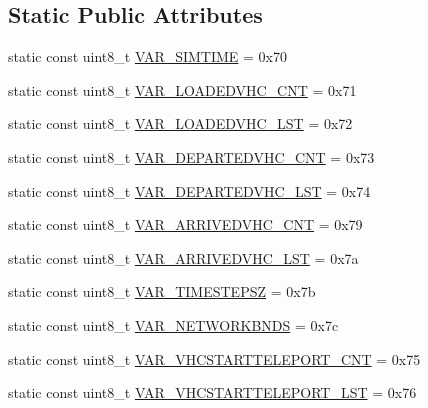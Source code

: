 \subsection*{Static Public Attributes}
\begin{DoxyCompactItemize}
\item 
static const uint8\+\_\+t \hyperlink{classtraci__api_1_1_simulation_ad85a2daa3b6e62afebf23c63aa54c5a7}{V\+A\+R\+\_\+\+S\+I\+M\+T\+I\+ME} = 0x70
\item 
static const uint8\+\_\+t \hyperlink{classtraci__api_1_1_simulation_a0c320b73a88c6bd0d5d15b9b7d8ca079}{V\+A\+R\+\_\+\+L\+O\+A\+D\+E\+D\+V\+H\+C\+\_\+\+C\+NT} = 0x71
\item 
static const uint8\+\_\+t \hyperlink{classtraci__api_1_1_simulation_aef180578795a463be2e4b4d47674f07e}{V\+A\+R\+\_\+\+L\+O\+A\+D\+E\+D\+V\+H\+C\+\_\+\+L\+ST} = 0x72
\item 
static const uint8\+\_\+t \hyperlink{classtraci__api_1_1_simulation_a2211a9befd772188a83012e61d0bf890}{V\+A\+R\+\_\+\+D\+E\+P\+A\+R\+T\+E\+D\+V\+H\+C\+\_\+\+C\+NT} = 0x73
\item 
static const uint8\+\_\+t \hyperlink{classtraci__api_1_1_simulation_a4e5cf74cd62df38b5e0a4e750983c6e1}{V\+A\+R\+\_\+\+D\+E\+P\+A\+R\+T\+E\+D\+V\+H\+C\+\_\+\+L\+ST} = 0x74
\item 
static const uint8\+\_\+t \hyperlink{classtraci__api_1_1_simulation_aa2763aba4aa46ba82dc9b1f258101ca4}{V\+A\+R\+\_\+\+A\+R\+R\+I\+V\+E\+D\+V\+H\+C\+\_\+\+C\+NT} = 0x79
\item 
static const uint8\+\_\+t \hyperlink{classtraci__api_1_1_simulation_ae7a55aa19afe46dd3e54ed60ccc736bf}{V\+A\+R\+\_\+\+A\+R\+R\+I\+V\+E\+D\+V\+H\+C\+\_\+\+L\+ST} = 0x7a
\item 
static const uint8\+\_\+t \hyperlink{classtraci__api_1_1_simulation_a32191847f48857d89c02e27c7134e862}{V\+A\+R\+\_\+\+T\+I\+M\+E\+S\+T\+E\+P\+SZ} = 0x7b
\item 
static const uint8\+\_\+t \hyperlink{classtraci__api_1_1_simulation_aae0a592bee89106e697c1eb2bb312b74}{V\+A\+R\+\_\+\+N\+E\+T\+W\+O\+R\+K\+B\+N\+DS} = 0x7c
\item 
static const uint8\+\_\+t \hyperlink{classtraci__api_1_1_simulation_ad9ea6052e8bbce54c86cccd34d949859}{V\+A\+R\+\_\+\+V\+H\+C\+S\+T\+A\+R\+T\+T\+E\+L\+E\+P\+O\+R\+T\+\_\+\+C\+NT} = 0x75
\item 
static const uint8\+\_\+t \hyperlink{classtraci__api_1_1_simulation_a143172fa14c4207f49e634c7b2624627}{V\+A\+R\+\_\+\+V\+H\+C\+S\+T\+A\+R\+T\+T\+E\+L\+E\+P\+O\+R\+T\+\_\+\+L\+ST} = 0x76

\end{DoxyCompactItemize}
